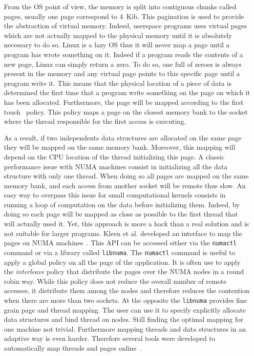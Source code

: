 From the \gls{OS} point of view, the memory is split into contiguous chunks called pages, usually one page correspond to \SI{4}{Kib}.
This pagination is used to provide the abstraction of virtual memory.
Indeed, userspace programs uses virtual pages which are not actually mapped to the physical memory until it is absolutely necessary to do so.
Linux is a lazy \gls{OS} thus it will never map a page until a program has wrote something on it.
Indeed if a program reads the contents of a new page, Linux can simply return a zero.
To do so, one full of zeroes is always present in the memory and any virtual page points to this specific page until a program write it.
This means that the physical location of a piece of data is determined the first time that a program write something on the page on which it has been allocated.
Furthermore, the page will be mapped according to the first touch~\cite{Marchetti95Using} policy.
This policy maps a page on the closest memory bank to the socket where the thread responsible for the first access is executing.

As a result, if two independents data structures are allocated on the same page they will be mapped on the same memory bank.
Moreover, this mapping will depend on the \gls{CPU} location of the thread initializing this page.
A classic performance issue with \gls{NUMA} machines consist in initializing all the data structure with only one thread.
When doing so all pages are mapped on the same memory bank, and each access from another socket will be remote thus slow.
An easy way to overpass this issue for small computational kernels consists in running a loop of computation on the data before initializing them.
Indeed, by doing so each page will be mapped as close as possible to the first thread that will actually used it.
Yet, this approach is more a hack than a real solution and is not suitable for larger programs.
Kleen et al. developed an interface to map the pages on \gls{NUMA} machines~\cite{Kleen05NUMA}.
This \gls{API} can be accessed either via the \texttt{numactl} command or via a library called \texttt{libnuma}.
The \texttt{numactl} command is useful to apply a global policy on all the page of the application.
It is often use to apply the \emph{interleave} policy that distribute the pages over the \gls{NUMA} nodes in a round robin way.
While this policy does not reduce the overall number of remote accesses, it distribute them among the nodes and therefore reduces the contention when there are more than two sockets.
At the opposite the \texttt{libnuma} provides fine grain page and thread mapping.
The user can use it to specify explicitly allocate data structures and bind thread on nodes.
Still finding the optimal mapping for one machine not trivial.
Furthermore mapping threads and data structures in an adaptive way is even harder.
Therefore several tools were developed to automatically map threads and pages online~\cite{Diener14kMAF,Corbet12Toward}.

